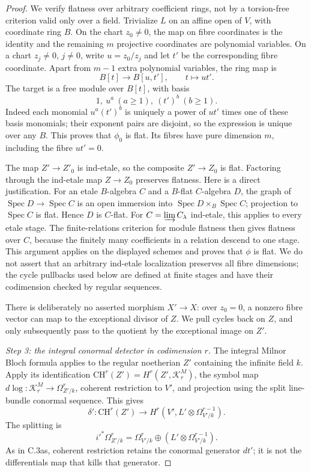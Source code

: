 \begin{proof}
We verify flatness over arbitrary coefficient rings, not by a
torsion-free criterion valid only over a field. Trivialize $L$ on
an affine open of $V$, with coordinate ring $B$. On the chart
$z_0\ne0$, the map on fibre coordinates is the identity and the
remaining $m$ projective coordinates are polynomial variables.
On a chart $z_j\ne0$, $j\ne0$, write $u=z_0/z_j$ and let $t'$
be the corresponding fibre coordinate. Apart from $m-1$ extra
polynomial variables, the ring map is
\[
                  B[t]\longrightarrow B[u,t'],\qquad t\longmapsto ut'.
\]
The target is a free module over $B[t]$, with basis
\[
                    1,\ u^a\ (a\ge1),\ (t')^b\ (b\ge1).
\]
Indeed each monomial $u^a(t')^b$ is uniquely a power of $ut'$
times one of these basis monomials; their exponent pairs are
disjoint, so the expression is unique over any $B$. This proves
that $\phi_0$ is flat. Its fibres have pure dimension $m$, including
the fibre $ut'=0$.

The map $Z'\to Z'_0$ is ind-etale, so the composite
$Z'\to Z_0$ is flat. Factoring through the ind-etale map
$Z\to Z_0$ preserves flatness. Here is a direct justification.
For an etale $B$-algebra $C$ and a $B$-flat $C$-algebra $D$,
the graph of $\operatorname{Spec}D\to\operatorname{Spec}C$ is
an open immersion into
$\operatorname{Spec}D\times_B\operatorname{Spec}C$; projection
to $\operatorname{Spec}C$ is flat. Hence $D$ is $C$-flat.
For $C=\varinjlim C_\lambda$ ind-etale, this applies to every
etale stage. The finite-relations criterion for module flatness
then gives flatness over $C$, because the finitely many coefficients
in a relation descend to one stage. This argument applies on the
displayed schemes and proves that $\phi$ is flat. We do not assert
that an arbitrary ind-etale localization preserves all fibre
dimensions; the cycle pullbacks used below are defined at finite
stages and have their codimension checked by regular sequences.

There is deliberately no asserted morphism $X'\to X$:
over $z_0=0$, a nonzero fibre vector can map to the exceptional
divisor of $Z$. We pull cycles back on $Z$, and only subsequently
pass to the quotient by the exceptional image on $Z'$.

\emph{Step 3: the integral conormal detector in codimension $r$.}
The integral Milnor Bloch formula
\citep[Theorems~7.1 and 7.5]{cyKerz2009Milnor} applies to the
regular noetherian $Z'$ containing the infinite field $k$.
Apply its identification
$\mathrm{CH}^r(Z')=H^r(Z',\mathcal K_r^M)$, the symbol map
$d\log:\mathcal K_r^M\to\Omega^r_{Z'/k}$, coherent restriction
to $V'$, and projection using the split line-bundle conormal sequence.
This gives
\[
 \delta':\mathrm{CH}^r(Z')\longrightarrow
          H^r(V',L'\otimes\Omega^{r-1}_{V'/k}).
\]
The splitting is
\[
 i'^*\Omega^r_{Z'/k}
  =\Omega^r_{V'/k}\oplus
                  (L'\otimes\Omega^{r-1}_{V'/k}).
\]
As in C.3as, coherent restriction retains the conormal generator
$dt'$; it is not the differentials map that kills that generator.


\end{proof}
